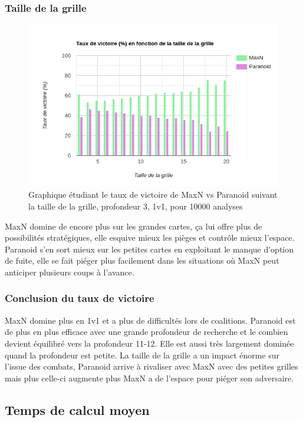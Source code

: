 \documentclass[a4paper,12pt]{article}
\begin{document}
\subsubsection{Taille de la grille}
\begin{figure}[h!]
		\centering
\includegraphics[width=0.5\linewidth]{TauxVictoireTaille}
		\caption{Graphique étudiant le taux de victoire de MaxN vs Paranoid suivant la taille de la grille, profondeur 3, 1v1, pour 10000 analyses}
	\end{figure}
MaxN domine de encore plus sur les grandes cartes, ça lui offre plus de possibilités stratégiques, elle esquive mieux les pièges et contrôle mieux l'espace. Paranoid s'en sort mieux sur les petites cartes en exploitant le manque d'option de fuite, elle se fait piéger plus facilement dans les situations où MaxN peut anticiper plusieurs coups à l'avance. 
\subsubsection{Conclusion du taux de victoire}
MaxN domine plus en 1v1 et a plus de difficultés lors de coalitions. Paranoid est de plus en plus efficace avec une grande profondeur de recherche et le combien devient équilibré vers la profondeur 11-12. Elle est aussi très largement dominée quand la profondeur est petite. La taille de la grille a un impact énorme sur l’issue des combats, Paranoid arrive à rivaliser avec MaxN avec des petites grilles mais plus celle-ci augmente plus MaxN a de l'espace pour piéger son adversaire.

\subsection{Temps de calcul moyen}
\end{document}
